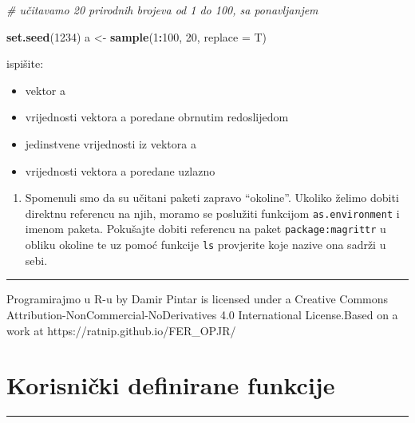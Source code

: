 \documentclass[]{book}
\newenvironment{Shaded}{\begin{snugshade}}{\end{snugshade}}
\newcommand{\KeywordTok}[1]{\textcolor[rgb]{0.13,0.29,0.53}{\textbf{#1}}}
\newcommand{\DataTypeTok}[1]{\textcolor[rgb]{0.13,0.29,0.53}{#1}}
\newcommand{\DecValTok}[1]{\textcolor[rgb]{0.00,0.00,0.81}{#1}}
\newcommand{\StringTok}[1]{\textcolor[rgb]{0.31,0.60,0.02}{#1}}
\newcommand{\CommentTok}[1]{\textcolor[rgb]{0.56,0.35,0.01}{\textit{#1}}}
\newcommand{\OperatorTok}[1]{\textcolor[rgb]{0.81,0.36,0.00}{\textbf{#1}}}
\newcommand{\NormalTok}[1]{#1}
\providecommand{\tightlist}{%
  \setlength{\itemsep}{0pt}\setlength{\parskip}{0pt}}
\theoremstyle{definition}
\theoremstyle{definition}
\theoremstyle{definition}
\theoremstyle{remark}
\begin{document}
\begin{Shaded}
\begin{Highlighting}[]
\CommentTok{# učitavamo 20 prirodnih brojeva od 1 do 100, sa ponavljanjem}

\KeywordTok{set.seed}\NormalTok{(}\DecValTok{1234}\NormalTok{)}
\NormalTok{a <-}\StringTok{ }\KeywordTok{sample}\NormalTok{(}\DecValTok{1}\OperatorTok{:}\DecValTok{100}\NormalTok{, }\DecValTok{20}\NormalTok{, }\DataTypeTok{replace =}\NormalTok{ T)}
\end{Highlighting}
\end{Shaded}

ispišite:

\begin{itemize}
\tightlist
\item
  vektor a
\item
  vrijednosti vektora a poredane obrnutim redoslijedom
\item
  jedinstvene vrijednosti iz vektora a
\item
  vrijednosti vektora a poredane uzlazno
\end{itemize}

\begin{enumerate}
\def\labelenumi{\arabic{enumi}.}
\setcounter{enumi}{2}
\tightlist
\item
  Spomenuli smo da su učitani paketi zapravo ``okoline''. Ukoliko želimo
  dobiti direktnu referencu na njih, moramo se poslužiti funkcijom
  \texttt{as.environment} i imenom paketa. Pokušajte dobiti referencu na
  paket \texttt{package:magrittr} u obliku okoline te uz pomoć funkcije
  \texttt{ls} provjerite koje nazive ona sadrži u sebi.
\end{enumerate}

\begin{center}\rule{0.5\linewidth}{\linethickness}\end{center}

{Programirajmo u R-u} by Damir Pintar is licensed under a Creative
Commons Attribution-NonCommercial-NoDerivatives 4.0 International
License.Based on a work at https://ratnip.github.io/FER\_OPJR/

\chapter{Korisnički definirane funkcije}\label{korisnik}

\begin{center}\rule{0.5\linewidth}{\linethickness}\end{center}
\end{document}

